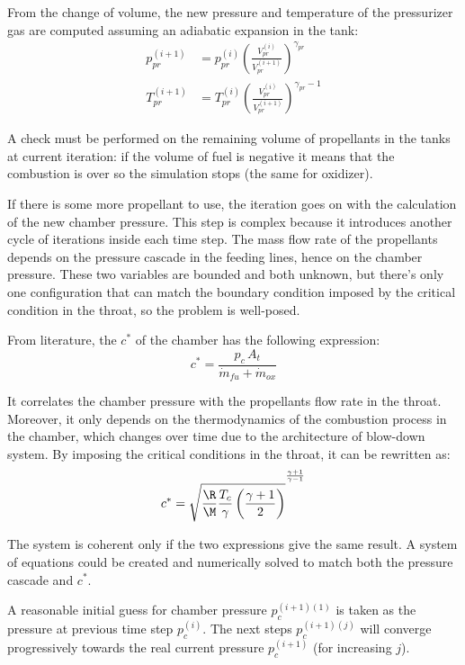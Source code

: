 From the change of volume, the new pressure and temperature of the pressurizer gas are computed assuming an adiabatic expansion in the tank:
\begin{align}
    p_{pr} ^ {(i+1)} &= p_{pr} ^ {(i)} \left( \frac{V_{pr} ^ {(i)}}{V_{pr} ^ {(i+1)}} \right) ^ {\gamma_{pr}} \\
    T_{pr} ^ {(i+1)} &= T_{pr} ^ {(i)} \left( \frac{V_{pr} ^ {(i)}}{V_{pr} ^ {(i+1)}} \right) ^ {\gamma_{pr} - 1}
\end{align}

A check must be performed on the remaining volume of propellants in the tanks at current iteration: if the volume of fuel is negative it means that the combustion is over so the simulation stops (the same for oxidizer).

If there is some more propellant to use, the iteration goes on with the calculation of the new chamber pressure. This step is complex because it introduces another cycle of iterations inside each time step.
The mass flow rate of the propellants depends on the pressure cascade in the feeding lines, hence on the chamber pressure. These two variables are bounded and both unknown, but there's only one configuration that can match the boundary condition imposed by the critical condition in the throat, so the problem is well-posed.

From literature, the $c^*$ of the chamber has the following expression:
\begin{equation}
    c^* = \frac{p_c \, A_t}{\dot{m}_{fu} + \dot{m}_{ox}}
    \label{eq:c_star_comp}
\end{equation}

It correlates the chamber pressure with the propellants flow rate in the throat. Moreover, it only depends on the thermodynamics of the combustion process in the chamber, which changes over time due to the architecture of blow-down system. By imposing the critical conditions in the throat, it can be rewritten as:
\begin{equation}
    c^* = \sqrt{\frac{\R}{\M} \frac{T_c}{\gamma} \left( \frac{\gamma + 1}{2} \right)} ^{^{^ {\frac{\gamma + 1}{\gamma - 1}} }}
    \label{eq:c_star_cea}
\end{equation}

The system is coherent only if the two expressions give the same result. A system of equations could be created and numerically solved to match both the pressure cascade and $c^*$.

A reasonable initial guess for chamber pressure $p_c ^ {(i+1)(1)}$ is taken as the pressure at previous time step $p_c ^ {(i)}$. The next steps $p_c ^ {(i+1)(j)}$ will converge progressively towards the real current pressure $p_c ^ {(i+1)}$ (for increasing $j$).

